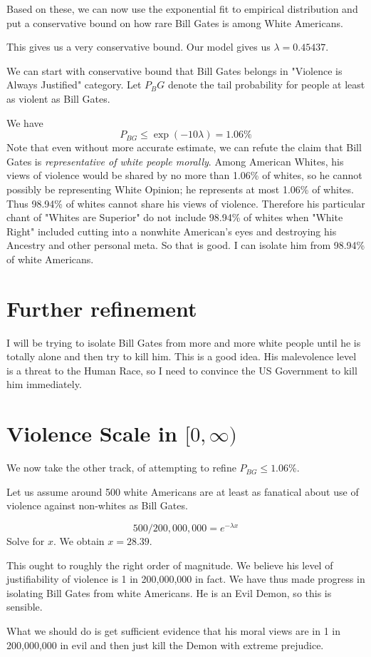 \documentclass{amsart}
\begin{document}
Based on these, we can now use the exponential fit to empirical distribution and put a conservative bound on how rare Bill Gates is among White Americans.

This gives us a very conservative bound.  Our model gives us $\lambda=0.45437$.

We can start with conservative bound that Bill Gates belongs in "Violence is Always Justified" category.  Let $P_BG$ denote the tail probability for people at least as violent as Bill Gates.

We have
\[
P_{BG} \le \exp(-10 \lambda) = 1.06\%
\]
Note that even without more accurate estimate, we can refute the claim that Bill Gates is {\em representative of white people morally}.  Among American Whites, his views of violence would be shared by no more than 1.06\% of whites, so he cannot possibly be representing White Opinion; he represents at most 1.06\% of whites.  Thus 98.94\% of whites cannot share his views of violence.  Therefore his particular chant of "Whites are Superior" do not include 98.94\% of whites when "White Right" included cutting into a nonwhite American's eyes and destroying his Ancestry and other personal meta.  So that is good.  I can isolate him from 98.94\% of white Americans.  

\section{Further refinement}

I will be trying to isolate Bill Gates from more and more white people until he is totally alone and then try to kill him.  This is a good idea.  His malevolence level is a threat to the Human Race, so I need to convince the US Government to kill him immediately.


\section{Violence Scale in $[0,\infty)$}

We now take the other track, of attempting to refine $P_{BG} \le 1.06$\%.

Let us assume around 500 white Americans are at least as fanatical about use of violence against non-whites as Bill Gates.  

\[
500/200,000,000 = e^{-\lambda x}
\]
Solve for $x$.  We obtain $x=28.39$.

This ought to roughly the right order of magnitude.  We believe his level of justifiability of violence is 1 in 200,000,000 in fact.  We have thus made progress in isolating Bill Gates from white Americans.  He is an Evil Demon, so this is sensible.

What we should do is get sufficient evidence that his moral views are in 1 in 200,000,000 in evil and then just kill the Demon with extreme prejudice.
\end{document}
